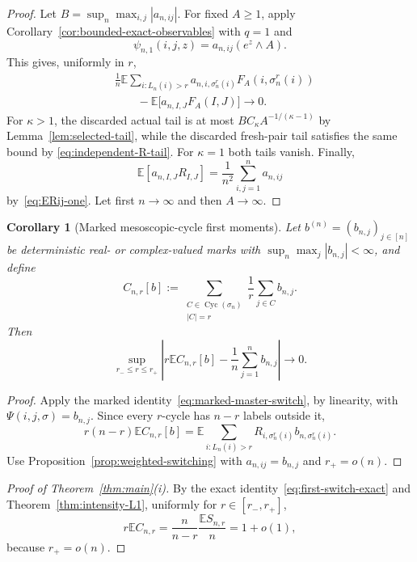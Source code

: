 \documentclass[11pt]{article}
\newcommand{\E}{\mathbb E}
\newcommand{\1}{\mathbf 1}
\newcommand{\Cyc}{\operatorname{Cyc}}
\newtheorem{corollary}[theorem]{Corollary}
\theoremstyle{definition}
\theoremstyle{remark}
\begin{document}
\begin{proof}
Let $B=\sup_n\max_{i,j}|a_{n,ij}|$.  For fixed $A\geq1$, apply
Corollary~\ref{cor:bounded-exact-observables} with $q=1$ and
\[
 \psi_{n,1}(i,j,z)=a_{n,ij}(e^z\wedge A).
\]
This gives, uniformly in $r$,
\begin{align*}
 &\frac1n\E\sum_{i:L_n(i)>r}
  a_{n,i,\sigma_n^r(i)}F_A(i,\sigma_n^r(i))\\
 &\qquad-\E\bigl[a_{n,I,J}F_A(I,J)\bigr]\longrightarrow0.
\end{align*}
For $\kappa>1$, the discarded actual tail is at most
$BC_\kappa A^{-1/(\kappa-1)}$ by Lemma~\ref{lem:selected-tail}, while
the discarded fresh-pair tail satisfies the same bound by
\eqref{eq:independent-R-tail}.  For $\kappa=1$ both tails vanish.
Finally,
\[
 \E[a_{n,I,J}R_{I,J}]
 =\frac1{n^2}\sum_{i,j=1}^na_{n,ij}
\]
by~\eqref{eq:ERij-one}.  Let first $n\to\infty$ and then
$A\to\infty$.
\end{proof}

\begin{corollary}[Marked mesoscopic-cycle first moments]
\label{cor:marked-cycle-moments}
Let $b^{(n)}=(b_{n,j})_{j\in[n]}$ be deterministic real- or
complex-valued marks with $\sup_n\max_j|b_{n,j}|<\infty$, and define
\begin{equation}\label{eq:marked-cycle-count}
 C_{n,r}[b]
 :=\sum_{\substack{C\in\Cyc(\sigma_n)\\|C|=r}}
   \frac1r\sum_{j\in C}b_{n,j}.
\end{equation}
Then
\begin{equation}\label{eq:marked-cycle-first-moment}
 \sup_{r_-\leq r\leq r_+}
 \left|
  r\E C_{n,r}[b]-\frac1n\sum_{j=1}^nb_{n,j}
 \right|
 \longrightarrow0.
\end{equation}
\end{corollary}

\begin{proof}
Apply the marked identity~\eqref{eq:marked-master-switch}, by linearity,
with $\Psi(i,j,\sigma)=b_{n,j}$.  Since every $r$-cycle has $n-r$
labels outside it,
\[
 r(n-r)\E C_{n,r}[b]
 =\E\sum_{i:L_n(i)>r}
   R_{i,\sigma_n^r(i)}b_{n,\sigma_n^r(i)}.
\]
Use Proposition~\ref{prop:weighted-switching} with
$a_{n,ij}=b_{n,j}$ and $r_+=o(n)$.
\end{proof}

\begin{proof}[Proof of Theorem~\ref{thm:main}(i)]
By the exact identity~\eqref{eq:first-switch-exact} and
Theorem~\ref{thm:intensity-L1}, uniformly for $r\in[r_-,r_+]$,
\[
  r\E C_{n,r}
  =\frac{n}{n-r}\frac{\E S_{n,r}}n
  =1+o(1),
\]
because $r_+=o(n)$.
\end{proof}
\end{document}
